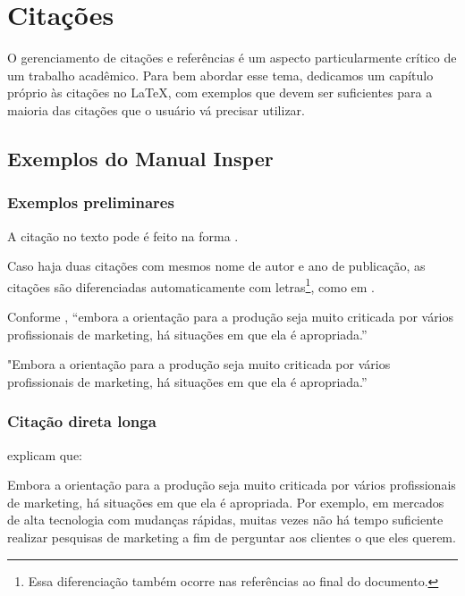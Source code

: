 \chapter{Citações}
O gerenciamento de citações e referências é um aspecto particularmente crítico de um trabalho acadêmico. Para bem abordar esse tema, dedicamos um capítulo próprio às citações no \LaTeX, com exemplos que devem ser suficientes para a maioria das citações que o usuário vá precisar utilizar.

\section{Exemplos do Manual Insper}

\subsection{Exemplos preliminares}

A citação no texto pode é feito na forma \textcite{rego1994pureza}.

Caso haja duas citações com mesmos nome de autor e ano de publicação, as citações são diferenciadas automaticamente com letras\footnote{Essa diferenciação também ocorre nas referências ao final do documento.}, como em \textcite{rego1994usina}.

Conforme \textcite[8]{churchill2012marketing}, “embora a orientação para a produção seja muito criticada por vários profissionais de marketing, há situações em que ela é apropriada.”

"Embora a orientação para a produção seja muito criticada por vários
profissionais de marketing, há situações em que ela é apropriada.” \parencite[8]{churchill2012marketing} 

\subsection{Citação direta longa}

\textcite[8]{churchill2012marketing} explicam que:

\begin{citacao}
Embora a orientação para a produção seja muito criticada
por vários profissionais de marketing, há situações em
que ela é apropriada. Por exemplo, em mercados de alta
tecnologia com mudanças rápidas, muitas vezes não há
tempo suficiente realizar pesquisas de marketing a fim de
perguntar aos clientes o que eles querem.
\end{citacao}

